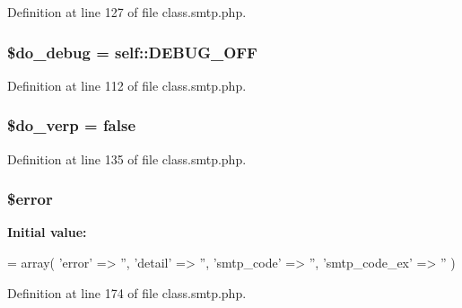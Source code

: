 Definition at line 127 of file class.\+smtp.\+php.

\subsubsection[{\texorpdfstring{\$do\+\_\+debug}{$do_debug}}]{\setlength{\rightskip}{0pt plus 5cm}\$do\+\_\+debug = self\+::\+D\+E\+B\+U\+G\+\_\+\+O\+FF}\hypertarget{class_s_m_t_p_a09ca59ee83fba6c8137646a13f1664d1}{}\label{class_s_m_t_p_a09ca59ee83fba6c8137646a13f1664d1}


Definition at line 112 of file class.\+smtp.\+php.

\subsubsection[{\texorpdfstring{\$do\+\_\+verp}{$do_verp}}]{\setlength{\rightskip}{0pt plus 5cm}\$do\+\_\+verp = false}\hypertarget{class_s_m_t_p_abf2ec34ae2e6abd0f598ea202a8fa807}{}\label{class_s_m_t_p_abf2ec34ae2e6abd0f598ea202a8fa807}


Definition at line 135 of file class.\+smtp.\+php.

\subsubsection[{\texorpdfstring{\$error}{$error}}]{\setlength{\rightskip}{0pt plus 5cm}\$error\hspace{0.3cm}{\ttfamily [protected]}}\hypertarget{class_s_m_t_p_aeba2ab722cedda53dbb7ec1a59f45550}{}\label{class_s_m_t_p_aeba2ab722cedda53dbb7ec1a59f45550}
{\bfseries Initial value\+:}
\begin{DoxyCode}
= array(
        \textcolor{stringliteral}{'error'} => \textcolor{stringliteral}{''},
        \textcolor{stringliteral}{'detail'} => \textcolor{stringliteral}{''},
        \textcolor{stringliteral}{'smtp\_code'} => \textcolor{stringliteral}{''},
        \textcolor{stringliteral}{'smtp\_code\_ex'} => \textcolor{stringliteral}{''}
    )
\end{DoxyCode}


Definition at line 174 of file class.\+smtp.\+php.

